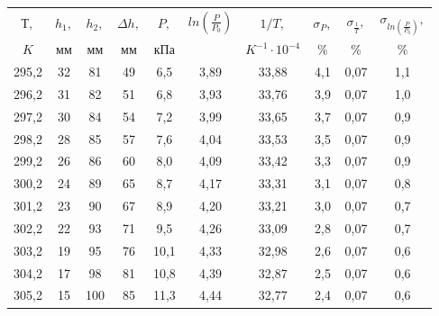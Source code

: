 \begin{center}
\begin{tabular}{|c|c|c|c|c|c|c|c|c|c|}
\hline
 $  Т,   $ & $    h_1 , $ & $ h_2 ,    $ & $  \Delta h,   $  & $     P,     $ & $  ln(\frac{P}{P_0})         $ & $   1/T,   $ & $    \sigma_P,   $  &  $   \sigma_{\frac{1}{T}},    $ & $ \sigma_{ln(\frac{P}{P_0})}    ,   $  \\
  $ K   $ & $  мм $ & $  мм    $ & $   мм    $  & $     кПа     $ & $        $ & $    K^{-1} \cdot 10^{-4}   $ & $    \%   $  & $   \%        $ & $  \%       $  \\
\hline 
       295,2   &    32      &    81     &     49   &    6,5   &  3,89   &    33,88       &      4,1    &     0,07      &         1,1            \\
\hline 
      296,2    &     31     &  82      &     51    &     6,8  & 3,93    &      33,76     &     3,9     &      0,07     &           1,0          \\
\hline 
        297,2  &     30     &       84    &     54    &     7,2  &    3,99 &    33,65       &      3,7    &     0,07      &           0,9          \\
\hline 
         298,2 &     28     &       85    &    57      &    7,6   &   4,04  &         33,53  &      3,5    &       0,07    &          0,9            \\
\hline 
         299,2 &    26      & 86          &  60        &   8,0    &  4,09   &      33,42     &      3,3    &      0,07     &          0,9            \\
\hline 
         300,2 &     24     &       89    &     65    &     8,7  &   4,17  &       33,31   &      3,1    &      0,07     &            0,8        \\
\hline
         301,2 &     23     &     90     &    67      &    8,9   &  4,20   &      33,21     &      3,0    &       0,07    &            0,7          \\
\hline 
       302,2   &     22     &      93    &     71     &    9,5   &   4,26  &      33,09     &     2,8     &   0,07        &           0,7           \\
\hline 
      303,2    &      19    &  95     &     76   &    10,1   &  4,33   &     32,98      &      2,6    &      0,07     &            0,6         \\
\hline 
     304,2     &     17     &     98    &     81     &     10,8  &  4,39   &     32,87      &      2,5    &     0,07     &             0,6         \\
\hline 
        305,2  &      15   &  100      &     85     &     11,3  &   4,44  &       32,77    &       2,4   &      0,07     &               0,6       \\

\end{tabular}
\end{center}
